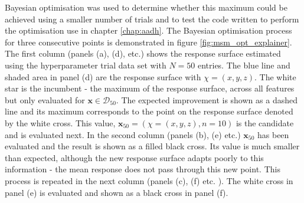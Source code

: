 Bayesian optimisation was used to determine whether this maximum could be achieved using a smaller number of trials and to test the code written to perform the optimisation use in chapter \ref{chap:aadh}. The Bayesian optimisation process for three consecutive points is demonstrated in figure \ref{fig:msm_opt_explainer}. The first column (panels (a), (d), etc.) shows the response surface estimated using the hyperparameter trial data set with $N=50$ entries. The blue line and shaded area in panel (d) are the response surface with $\chi=(x, y, z)$. The white star is the incumbent - the maximum of the response surface, across all features but only evaluated for $\mathbf{x}\in \mathcal{D}_{50}$. The expected improvement is shown as a dashed line and its maximum corresponds to the point on the response surface denoted by the white cross. This value,  $\mathbf{x}_{50} = \left(\chi=(x, y, z), n=10\right)$ is the candidate and is evaluated next. In the second column (panels (b), (e) etc.) $\mathbf{x}_{50}$ has been evaluated and the result is shown as a filled black cross. Its value is much smaller than expected, although the new response surface adapts poorly to this information - the mean response does not pass through this new point. This process is repeated in the next column (panels (c), (f) etc. ). The white cross in panel (e) is evaluated and shown as a black cross in panel (f). 

